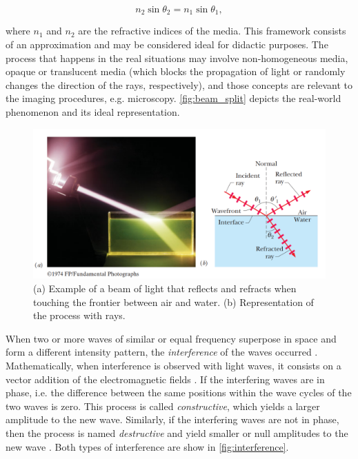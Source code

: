\begin{equation}
    \label{eqn:snells_law}
       n_{2}\sin{\theta_{2}} = n_{1}\sin{\theta_{1}},
\end{equation}

\noindent where $\mathit{n_{1}}$ and $\mathit{n_{2}}$ are the refractive indices of the media. This framework consists of an approximation and may be considered ideal for didactic purposes. The process that happens in the real situations may involve non-homogeneous media, opaque or translucent media (which blocks the propagation of light or randomly changes the direction of the rays, respectively), and those concepts are relevant to the imaging procedures, e.g. microscopy. \autoref{fig:beam_split} depicts the real-world phenomenon and its ideal representation.

\begin{figure}[htb]
	\centering
	\caption{\label{fig:beam_split} 
	    (a) Example of a beam of light that reflects and refracts when touching the frontier between air and water. (b) Representation of the process with rays.}
	\begin{center}
	    \includegraphics[scale=0.3]{images/fig3.png}
	\end{center}
	\centering
\end{figure}

When two or more waves of similar or equal frequency superpose in space and form a different intensity pattern, the \emph{interference} of the waves occurred \cite{tipler2008physics}. Mathematically, when interference is observed with light waves, it consists on a vector addition of the electromagnetic fields \cite{zilio2009optica}.
If the interfering waves are in phase, i.e. the difference between the same positions within the wave cycles of the two waves is zero. This process is called \emph{constructive}, which yields a larger amplitude to the new wave. Similarly, if the interfering waves are not in phase, then the process is named \emph{destructive} and yield smaller or null amplitudes to the new wave \cite{tipler2007physics}. Both types of interference are show in \autoref{fig:interference}.

